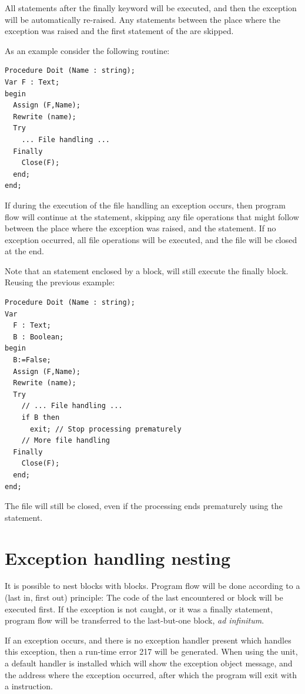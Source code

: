 All statements after the finally keyword will be executed, and then
the exception will be automatically re-raised. Any statements between the
place where the exception was raised and the first statement of the
 are skipped.

As an example consider the following routine:
\begin{verbatim}
Procedure Doit (Name : string);
Var F : Text;
begin
  Assign (F,Name);
  Rewrite (name);
  Try
    ... File handling ...
  Finally
    Close(F);
  end;
end;
\end{verbatim}
If during the execution of the file handling an exception occurs, then
program flow will continue at the  statement, skipping any
file operations that might follow between the place where the exception
was raised, and the  statement.
If no exception occurred, all file operations will be executed, and the file
will be closed at the end.

Note that an  statement enclosed by a  block,
will still execute the finally block. Reusing the previous example:
\begin{verbatim}
Procedure Doit (Name : string);
Var
  F : Text;
  B : Boolean;
begin
  B:=False;
  Assign (F,Name);
  Rewrite (name);
  Try
    // ... File handling ...
    if B then
      exit; // Stop processing prematurely
    // More file handling
  Finally
    Close(F);
  end;
end;
\end{verbatim}
The file will still be closed, even if the processing ends prematurely using
the  statement.

\section{Exception handling nesting}
It is possible to nest  blocks with 
blocks. Program flow will be done according to a  (last in, first
out) principle: The code of the last encountered  or
  block will be executed first. If the exception is not
caught, or it was a finally statement, program flow will be transferred to
the last-but-one block, {\em ad infinitum}.

If an exception occurs, and there is no exception handler present which
handles this exception, then a run-time error 217 will be generated.
When using the  unit, a default handler is installed which will show the exception object message, and the
address where the exception occurred, after which the program will exit with
a  instruction.


